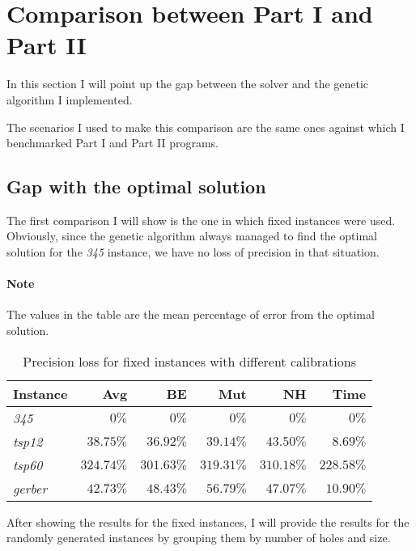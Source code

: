 \section{Comparison between Part I and Part II}

In this section I will point up the gap between the \cplex{} solver and the
genetic algorithm I implemented.

The scenarios I used to make this comparison are the same ones against which I
benchmarked Part I and Part II programs.

\subsection{Gap with the optimal solution}

The first comparison I will show is the one in which fixed instances were used.
Obviously, since the genetic algorithm always managed to find the optimal
solution for the \textit{345} instance, we have no loss of precision in that
situation.

\paragraph{Note} The values in the table are the mean percentage of error from
the optimal solution.

\begin{table}[H]
  \centering
  \begin{tabular}{|l|r|r|r|r|r|}
    \hline
    \textbf{Instance} & \textbf{Avg} & \textbf{BE} &
    \textbf{Mut} & \textbf{NH} & \textbf{Time} \\
    \hline
    \hline
    \textit{345} & $0\%$ & $0\%$ & $0\%$ & $0\%$ & $0\%$ \\
    \hline
    \textit{tsp12} & $38.75\%$ & $36.92\%$ &
            $39.14\%$ & $43.50\%$ & $8.69\%$ \\
    \hline
    \textit{tsp60} & $324.74\%$ & $301.63\%$ &
            $319.31\%$ & $310.18\%$ & $228.58\%$ \\
    \hline
    \textit{gerber} & $42.73\%$ & $48.43\%$ &
            $56.79\%$ & $47.07\%$ & $10.90\%$ \\
    \hline
  \end{tabular}
  \caption{Precision loss for fixed instances with different calibrations}
  \label{tab:precision-fixed}
\end{table}

After showing the results for the fixed instances, I will provide the results
for the randomly generated instances by grouping them by number of holes and
size.


